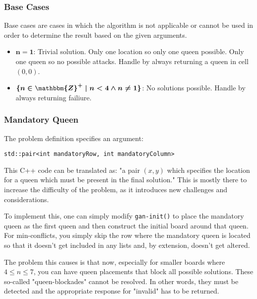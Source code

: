 \documentclass{article}
\begin{document}
\subsubsection{Base Cases}
Base cases are cases in which the algorithm is not applicable or cannot be used in order to determine the result based on the given arguments.

\begin{itemize}
    \item $\boldsymbol{n = 1}$: Trivial solution. Only one location so only one queen possible. Only one queen so no possible attacks.
          Handle by always returning a queen in cell $(0, 0)$.
    \item $\boldsymbol{\{ n \in \mathbbm{Z}^{+} \mid n < 4 \land n \neq 1\}}$: No solutions possible. Handle by always returning failiure.
\end{itemize}

\clearpage
\subsubsection{Mandatory Queen}
The problem definition specifies an argument:

\begin{lstlisting}
std::pair<int mandatoryRow, int mandatoryColumn>
\end{lstlisting}

This C++ code can be translated as: "a pair $(x, y)$ which specifies the location for a queen which must be present in the final solution."
This is mostly there to increase the difficulty of the problem, as it introduces new challenges and considerations.

To implement this, one can simply modify \texttt{gan-init()} to place the mandatory queen as the first queen and then construct the initial board around that queen.
For min-conflicts, you simply skip the row where the mandatory queen is located so that it doesn't get included in any lists and, by extension, doesn't get altered.

The problem this causes is that now, especially for smaller boards where \(4 \leq n \leq 7\),
you can have queen placements that block all possible solutions. These so-called "queen-blockades" cannot be resolved.
In other words, they must be detected and the appropriate response for "invalid" has to be returned.
\end{document}
